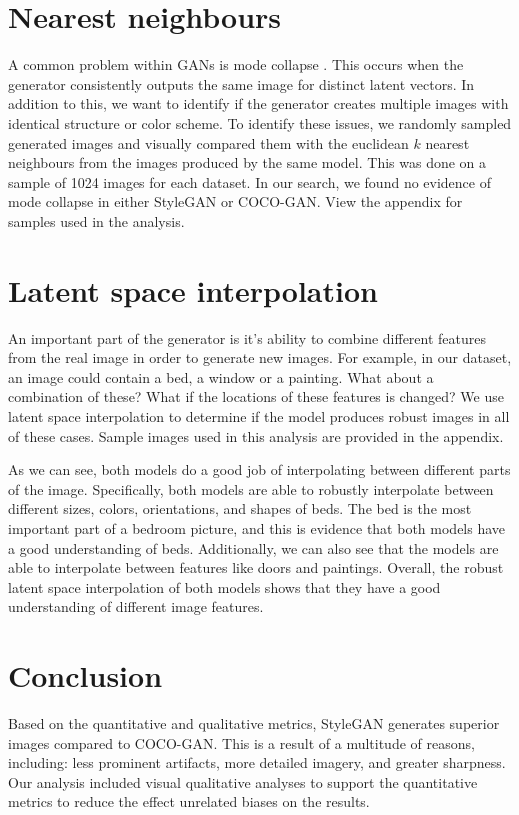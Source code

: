 \documentclass{article}
\begin{document}
          \section{Nearest neighbours}
        \label{subsec:nearestneighbours}
        A common problem within GANs is mode collapse \cite{modecollapse}.
        This occurs when the generator consistently outputs the same image for distinct latent vectors.
        In addition to this, we want to identify if the generator creates multiple images with identical structure or color scheme.
        To identify these issues, we randomly sampled generated images and visually compared them with the euclidean $k$ nearest neighbours from the images produced by the same model. This was done on a sample of 1024 images for each dataset.
        In our search, we found no evidence of mode collapse in either StyleGAN or COCO-GAN. View the appendix for samples used in the analysis.
        
         \section{Latent space interpolation}
         An important part of the generator is it's ability to combine different features from the real image in order to generate new images.
        For example, in our dataset, an image could contain a bed, a window or a painting. What about a combination of these?
        What if the locations of these features is changed? We use latent space interpolation to determine if the model produces robust images in all of these cases. Sample images used in this analysis are provided in the appendix.
        
         As we can see, both models do a good job of interpolating between different parts of the image. Specifically, both models are able to robustly interpolate between different sizes, colors, orientations, and shapes of beds. The bed is the most important part of a bedroom picture, and this is evidence that both models have a good understanding of beds. Additionally, we can also see that the models are able to interpolate between features like doors and paintings. Overall, the robust latent space interpolation of both models shows that they have a good understanding of different image features.
        
    
        \section{Conclusion}
        Based on the quantitative and qualitative metrics, StyleGAN generates superior images compared to COCO-GAN.
        This is a result of a multitude of reasons, including: less prominent artifacts, more detailed imagery, and greater sharpness.
        Our analysis included visual qualitative analyses to support the quantitative metrics to reduce the effect unrelated biases on the results.
        
\end{document}
